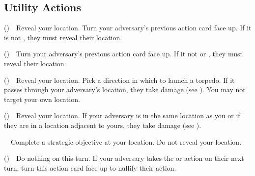 \subsection*{Utility Actions}
\begin{description}[leftmargin=1em, labelwidth=0pt, labelsep=0pt]
\item[]\PPING{} (\LOUD{})\ \ Reveal your location. Turn your adversary's previous action card face up. If it is not \DEEP{}, they must reveal their location.
\item[] \LISTEN{} (\QUIET{})\ \ Turn your adversary's previous action card face up. If it not \DEEP{} or \QUIET{}, they must reveal their location.
\item[]\LAUNCH{} (\LOUD{})\ \ Reveal your location. Pick a direction in which to launch a torpedo. If it passes through your adversary's location, they take damage (see {}). You may not target your own location.
\item[]\SHOOT{} (\LOUD{})\ \  Reveal your location. If your adversary is in the same location as you or if they are in a location adjacent to yours, they take damage (see {}).
\item[]\ENCRYPT{}\ \ Complete a strategic objective at your location. Do not reveal your location.
\item[]\DIVE{} (\DEEP{})\ \  Do nothing on this turn. If your adversary takes the \LAUNCH{} or \SHOOT{} action on their next turn, turn this action card face up to nullify their action.
\end{description}

